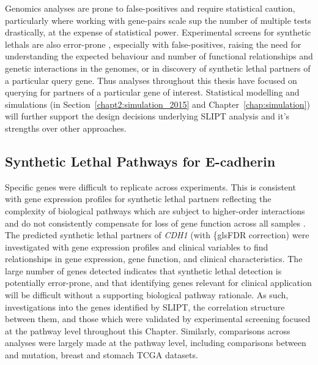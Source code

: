 Genomics analyses are prone to false-positives and require statistical caution, particularly where working with gene-pairs scale sup the number of multiple tests drastically, at the expense of statistical power.  Experimental screens for \glspl{synthetic lethal} are also error-prone \citep{Lu2015, Fece2015, Lord2014}, especially with false-positives, raising the need for understanding the expected behaviour and number of functional relationships and genetic interactions in the \glspl{genome}, or in discovery of \gls{synthetic lethal} partners of a particular query gene. Thus analyses throughout this thesis have focused on querying for partners of a particular gene of interest. Statistical modelling and simulations (in Section~\ref{chapt2:simulation_2015} and Chapter~\ref{chap:simulation}) will further support the design decisions underlying \gls{SLIPT} analysis and it's strengths over other approaches.

\subsection{Synthetic Lethal Pathways for \gls{E-cadherin}}

Specific genes were difficult to replicate across experiments. This is consistent with \gls{gene expression} profiles for \gls{synthetic lethal} partners reflecting the complexity of biological pathways which are subject to higher-order interactions and do not consistently compensate for loss of gene function across all samples \citep{Kelly2013, Jerby2014, Lu2015}. The predicted \gls{synthetic lethal} partners of \textit{CDH1} (with \{gls{FDR} correction) were investigated with \gls{gene expression} profiles and clinical variables to find relationships in \gls{gene expression}, gene function, and clinical characteristics. The large number of genes detected indicates that \gls{synthetic lethal} detection is potentially error-prone, and that identifying genes relevant for clinical application will be difficult without a supporting biological pathway rationale. As such, investigations into the genes identified by \gls{SLIPT}, the correlation structure between them, and those which were validated by experimental screening \citep{Telford2015} focused at the pathway level throughout this Chapter. Similarly, comparisons across analyses were largely made at the pathway level, including comparisons between  and \gls{mutation}, breast and stomach \gls{TCGA} datasets.%

